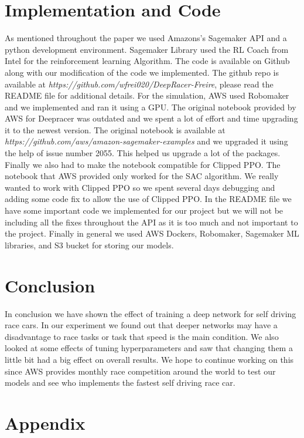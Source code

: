 \documentclass[journal]{IEEEtran}
\begin{document}
\section{Implementation and Code}
As mentioned throughout the paper we used Amazons’s Sagemaker API and a python development environment.  Sagemaker Library used the RL Coach from Intel for the reinforcement learning Algorithm.  The code is available on Github along with our modification of the code we implemented.  The github repo is available at \emph{https://github.com/wfrei020/DeepRacer-Freire}, please read the README file for additional details.  For the simulation, AWS used Robomaker and we implemented and ran it using a GPU.  The original notebook provided by AWS for Deepracer was outdated and we spent a lot of effort and time upgrading it to the newest version.  The original notebook is available at \emph{https://github.com/aws/amazon-sagemaker-examples} and we upgraded it using the help of issue number 2055.  This helped us upgrade a lot of the packages.  Finally we also had to make the notebook compatible for Clipped PPO.  The notebook that AWS provided only worked for the SAC algorithm.  We really wanted to work with Clipped PPO so we spent several days debugging and adding some code fix to allow the use of Clipped PPO.  In the README file we have some important code we implemented for our project but we will not be including all the fixes throughout the API as it is too much and not important to the project. Finally in general we used AWS Dockers, Robomaker, Sagemaker ML libraries, and S3 bucket for storing our models. 

\section{Conclusion}
In conclusion we have shown the effect of training a deep network for self driving race cars.  In our experiment we found out that deeper networks may have a disadvantage to race tasks or task that speed is the main condition.  We also looked at some effects of tuning hyperparameters and saw that changing them a little bit had a big effect on overall results.  We hope to continue working on this since AWS provides monthly race competition around the world to test our models and see who implements the fastest self driving race car.




\section{Appendix}
\label{appendix}
\end{document}
